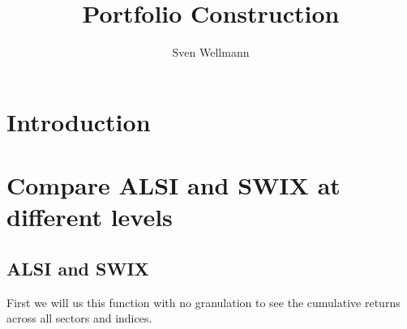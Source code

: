 \documentclass[11pt,preprint, authoryear]{elsarticle}
\numberwithin{equation}{section}
\numberwithin{figure}{section}
\numberwithin{table}{section}
\begin{document}
\begin{frontmatter}  %

\title{Portfolio Construction}





\author[Add1]{Sven Wellmann}





\address[Add1]{Stellenbosch University, Stellenbosch, South Africa}



\vspace{1cm}





\vspace{0.5cm}

\end{frontmatter}



\pagestyle{fancy}
\chead{}
\rhead{}
\lfoot{}
\lhead{}
\cfoot{}


\headsep 35pt %




\hypertarget{introduction}{%
\section{\texorpdfstring{Introduction
\label{Introduction}}{Introduction }}\label{introduction}}

\hypertarget{compare-alsi-and-swix-at-different-levels}{%
\section{Compare ALSI and SWIX at different
levels}\label{compare-alsi-and-swix-at-different-levels}}

\hypertarget{alsi-and-swix}{%
\subsection{ALSI and SWIX}\label{alsi-and-swix}}

First we will us this function with no granulation to see the cumulative
returns across all sectors and indices.
\end{document}
